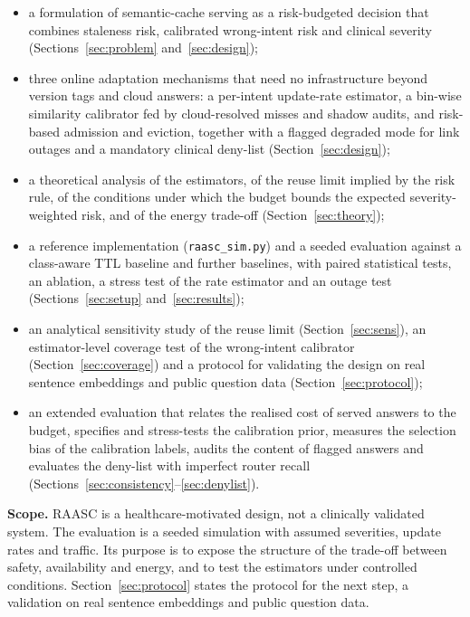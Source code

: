 \documentclass[journal]{IEEEtran}
\begin{document}
\begin{itemize}
\item a formulation of semantic-cache serving as a risk-budgeted decision that combines staleness risk, calibrated wrong-intent risk and clinical severity (Sections~\ref{sec:problem} and~\ref{sec:design});
\item three online adaptation mechanisms that need no infrastructure beyond version tags and cloud answers: a per-intent update-rate estimator, a bin-wise similarity calibrator fed by cloud-resolved misses and shadow audits, and risk-based admission and eviction, together with a flagged degraded mode for link outages and a mandatory clinical deny-list (Section~\ref{sec:design});
\item a theoretical analysis of the estimators, of the reuse limit implied by the risk rule, of the conditions under which the budget bounds the expected severity-weighted risk, and of the energy trade-off (Section~\ref{sec:theory});
\item a reference implementation (\texttt{raasc\_sim.py}) and a seeded evaluation against a class-aware TTL baseline and further baselines, with paired statistical tests, an ablation, a stress test of the rate estimator and an outage test (Sections~\ref{sec:setup} and~\ref{sec:results});
\item an analytical sensitivity study of the reuse limit (Section~\ref{sec:sens}), an estimator-level coverage test of the wrong-intent calibrator (Section~\ref{sec:coverage}) and a protocol for validating the design on real sentence embeddings and public question data (Section~\ref{sec:protocol});
\item an extended evaluation that relates the realised cost of served answers to the budget, specifies and stress-tests the calibration prior, measures the selection bias of the calibration labels, audits the content of flagged answers and evaluates the deny-list with imperfect router recall (Sections~\ref{sec:consistency}--\ref{sec:denylist}).
\end{itemize}

\textbf{Scope.} RAASC is a healthcare-motivated design, not a clinically validated system. The evaluation is a seeded simulation with assumed severities, update rates and traffic. Its purpose is to expose the structure of the trade-off between safety, availability and energy, and to test the estimators under controlled conditions. Section~\ref{sec:protocol} states the protocol for the next step, a validation on real sentence embeddings and public question data.
\end{document}
